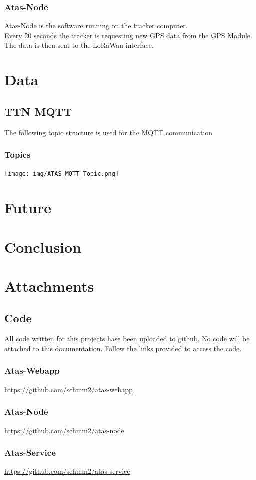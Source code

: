 \documentclass[a4paper,11pt, oneside]{report}
\theoremstyle{definition}
\begin{document}
\newpage
  
\subsection{Atas-Node}  
Atas-Node is the software running on the tracker computer.\\
Every 20 seconds the tracker is requesting new GPS data from the GPS Module.\\
The data is then sent to the LoRaWan interface. 


\chapter{Data}
\section{TTN MQTT}
The following topic structure is used for the MQTT communication
\subsection{Topics}
\texttt{[image: img/ATAS\_MQTT\_Topic.png]}\\[1cm]    

\chapter{Future}

\chapter{Conclusion}

\chapter{Attachments}
\section{Code}
All code written for this projects hase been uploaded to github. No code will be attached to this documentation. Follow the links provided to access the code.
\subsection{Atas-Webapp}
\url{https://github.com/schmm2/atas-webapp}
\subsection{Atas-Node}
\url{https://github.com/schmm2/atas-node}
\subsection{Atas-Service}
\url{https://github.com/schmm2/atas-service}


\printglossaries
\end{document}
